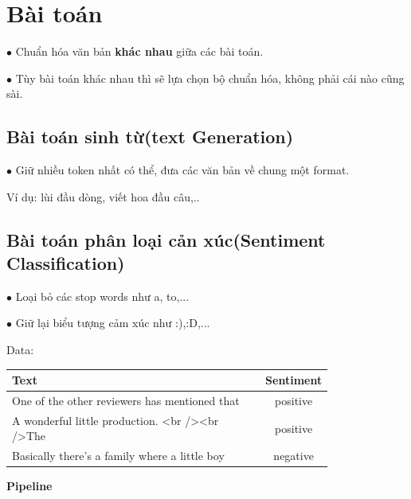 \documentclass[final,letterpaper,twoside,12pt]{report}
\begin{document}
\section{Bài toán}

$\bullet$ Chuẩn hóa văn bản \textbf{khác nhau} giữa các bài toán.

$\bullet$ Tùy bài toán khác nhau thì sẽ lựa chọn bộ chuẩn hóa, không phải cái nào cũng sài.

\subsection{Bài toán sinh từ(text Generation)}

$\bullet$ Giữ nhiều token nhất có thể, đưa các văn bản về chung một format.

Ví dụ: lùi đầu dòng, viết hoa đầu câu,..

\subsection{Bài toán phân loại cản xúc(Sentiment Classification)}

$\bullet$ Loại bỏ các stop words như a, to,...

$\bullet$ Giữ lại biểu tượng cảm xúc như :),:D,...

Data:

\begin{tabular}{|p{0.8\linewidth}|c|}
	\hline
	Text                                           & Sentiment \\
	\hline
	One of the other reviewers has mentioned that  & positive  \\\hline
	A wonderful little production. <br /><br />The & positive  \\\hline
	Basically there's a family where a little boy  & negative  \\\hline
\end{tabular}

\textbf{Pipeline}

\end{document}
